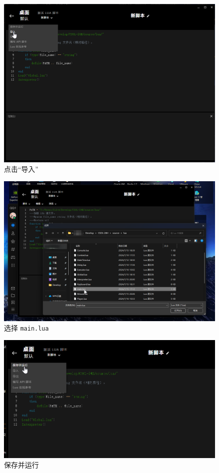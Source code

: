 \begin{figure}[H]
    \Centering
    \includegraphics[width=\textwidth]{docs/assets/import.png}
    \caption{点击“导入”}
\end{figure}

\begin{figure}[H]
    \Centering
    \includegraphics[width=\textwidth]{docs/assets/main.png}
    \caption{选择 \lstinline{main.lua}}
\end{figure}

\begin{figure}[H]
    \Centering
    \includegraphics[width=\textwidth]{docs/assets/save_and_run.png}
    \caption{保存并运行}
\end{figure}

